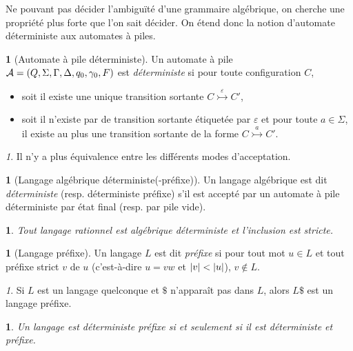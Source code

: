 \documentclass[11pt,a4paper]{article}
\theoremstyle{plain}
\theoremstyle{definition}
\newtheorem{defn}[thm]{\protect\definitionname}
\theoremstyle{definition}
\theoremstyle{remark}
\theoremstyle{remark}
\newtheorem{rem}[thm]{\protect\remarkname}
\theoremstyle{plain}
\theoremstyle{plain}
\newtheorem{prop}[thm]{\protect\propositionname}
\theoremstyle{plain}
\theoremstyle{remark}
\providecommand{\definitionname}{Définition}
\providecommand{\propositionname}{Proposition}
\providecommand{\remarkname}{Remarque}
\begin{document}
Ne pouvant pas décider l'ambiguïté d'une grammaire algébrique, on cherche une propriété plus forte que l'on sait décider. On étend donc la notion d'automate déterministe aux automates à piles.

\begin{defn}[Automate à pile déterministe]
	Un automate à pile \\$\mathcal{A}=(Q,\Sigma, \Gamma, \Delta, q_0, \gamma_0, F)$ est \emph{déterministe} si pour toute configuration $C$,
	\begin{itemize}
		\item soit il existe une unique transition sortante $C\overset{\varepsilon}{\rightarrowtail}C'$,
		\item soit il n'existe par de transition sortante étiquetée par $\varepsilon$ et pour toute $a\in \Sigma$, il existe au plus une transition sortante de la forme $C\overset{a}{\rightarrowtail}C'$.
	\end{itemize}
\end{defn}

\begin{rem}
	Il n'y a plus équivalence entre les différents modes d'acceptation.
\end{rem}

\begin{defn}[Langage algébrique déterministe(-préfixe)] %
	Un langage algébrique est dit \emph{déterministe} (resp. déterministe préfixe) s'il est accepté par un automate à pile déterministe par état final (resp. par pile vide).
\end{defn}

\begin{prop}
	Tout langage rationnel est algébrique déterministe et l'inclusion est stricte.
\end{prop}

\begin{defn}[Langage préfixe]
	Un langage $L$ est dit \emph{préfixe} si pour tout mot $u\in L$ et tout préfixe strict $v$ de $u$ (c'est-à-dire $u=vw$ et $\left|v\right| < \left|u\right|$), $v\not\in L$.
\end{defn}

\begin{rem}
	Si $L$ est un langage quelconque et $\$$ n'apparaît pas dans $L$, alors $L\$$ est un langage préfixe.
\end{rem}

\begin{prop} %
	Un langage est déterministe préfixe si et seulement si il est déterministe et préfixe.
\end{prop}
\end{document}

